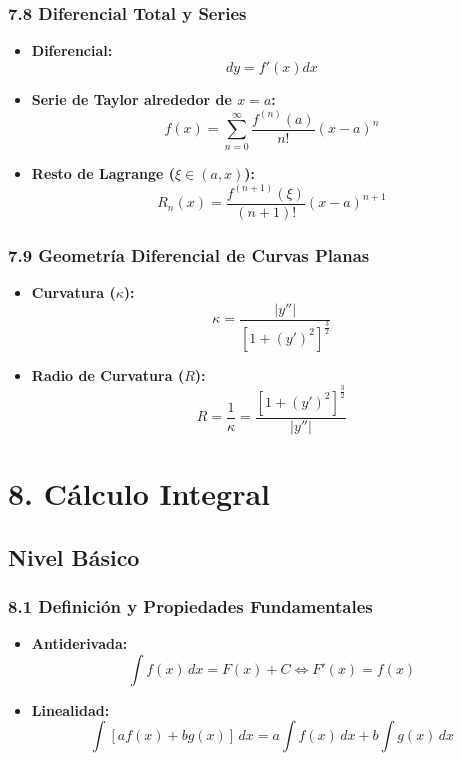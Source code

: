 \documentclass[11pt,a4paper]{article}
\begin{document}
\subsubsection*{7.8 Diferencial Total y Series}

\begin{itemize}
  \item \textbf{Diferencial:}
  \[
    dy = f'(x) dx
  \]
  \item \textbf{Serie de Taylor alrededor de $x = a$:}
  \[
    f(x) = \sum_{n=0}^\infty \frac{f^{(n)}(a)}{n!} (x - a)^n
  \]
  \item \textbf{Resto de Lagrange ($\xi \in (a, x)$):}
  \[
    R_n(x) = \frac{f^{(n+1)}(\xi)}{(n+1)!} (x - a)^{n+1}
  \]
\end{itemize}

\subsubsection*{7.9 Geometría Diferencial de Curvas Planas}

\begin{itemize}
  \item \textbf{Curvatura ($\kappa$):}
  \[
    \kappa = \frac{|y''|}{[1 + (y')^2]^{\frac{3}{2}}}
  \]
  \item \textbf{Radio de Curvatura ($R$):}
  \[
    R = \frac{1}{\kappa} = \frac{[1 + (y')^2]^{\frac{3}{2}}}{|y''|}
  \]
\end{itemize}

\section*{8. Cálculo Integral}

\subsection*{Nivel Básico}

\subsubsection*{8.1 Definición y Propiedades Fundamentales}

\begin{itemize}
  \item \textbf{Antiderivada:}
  \[
    \int f(x) \, dx = F(x) + C \iff F'(x) = f(x)
  \]
  \item \textbf{Linealidad:}
  \[
    \int [a f(x) + b g(x)] \, dx = a \int f(x) \, dx + b \int g(x) \, dx
  \]
\end{itemize}
\end{document}
